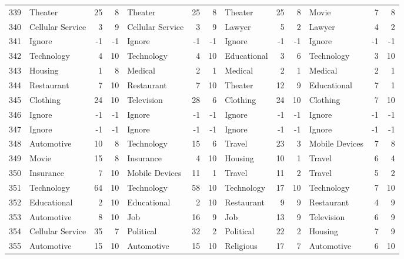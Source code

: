 \begin{figure}[htbp]
\begin{tabular}{rlrrlrrlrrlrr}
    339   & Theater & 25    & 8     & Theater & 25    & 8     & Theater & 25    & 8     & Movie & 7     & 8 \\
    340   & Cellular Service & 3     & 9     & Cellular Service & 3     & 9     & Lawyer & 5     & 2     & Lawyer & 4     & 2 \\
    341   & Ignore & -1    & -1    & Ignore & -1    & -1    & Ignore & -1    & -1    & Ignore & -1    & -1 \\
    342   & Technology & 4     & 10    & Technology & 4     & 10    & Educational & 3     & 6     & Technology & 3     & 10 \\
    343   & Housing & 1     & 8     & Medical & 2     & 1     & Medical & 2     & 1     & Medical & 2     & 1 \\
    344   & Restaurant & 7     & 10    & Restaurant & 7     & 10    & Theater & 12    & 9     & Educational & 7     & 1 \\
    345   & Clothing & 24    & 10    & Television & 28    & 6     & Clothing & 24    & 10    & Clothing & 7     & 10 \\
    346   & Ignore & -1    & -1    & Ignore & -1    & -1    & Ignore & -1    & -1    & Ignore & -1    & -1 \\
    347   & Ignore & -1    & -1    & Ignore & -1    & -1    & Ignore & -1    & -1    & Ignore & -1    & -1 \\
    348   & Automotive & 10    & 8     & Technology & 15    & 6     & Travel & 23    & 3     & Mobile Devices & 7     & 8 \\
    349   & Movie & 15    & 8     & Insurance & 4     & 10    & Housing & 10    & 1     & Travel & 6     & 4 \\
    350   & Insurance & 7     & 10    & Mobile Devices & 11    & 1     & Travel & 11    & 2     & Travel & 5     & 2 \\
    351   & Technology & 64    & 10    & Technology & 58    & 10    & Technology & 17    & 10    & Technology & 7     & 10 \\
    352   & Educational & 2     & 10    & Educational & 2     & 10    & Restaurant & 9     & 9     & Restaurant & 4     & 9 \\
    353   & Automotive & 8     & 10    & Job   & 16    & 9     & Job   & 13    & 9     & Television & 6     & 9 \\
    354   & Cellular Service & 35    & 7     & Political & 32    & 2     & Political & 22    & 2     & Housing & 7     & 9 \\
    355   & Automotive & 15    & 10    & Automotive & 15    & 10    & Religious & 17    & 7     & Automotive & 6     & 10 \\

\end{tabular}
\end{figure}
